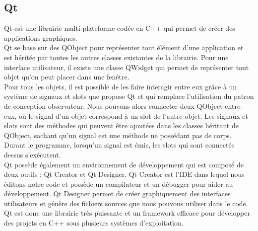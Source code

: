 \subsection{Qt}

Qt est une librairie multi-plateforme codée en C++ qui permet de créer des applications graphiques. \\

Qt se base sur des QObject pour représenter tout élément d'une application et est héritée par toutes les autres classes existantes de la librairie. Pour une interface utilisateur, il existe une classe QWidget qui permet de représenter tout objet qu'on peut placer dans une fenêtre.\\

Pour tous les objets, il est possible de les faire interagir entre eux grâce à un système de signaux et slots que propose Qt et qui remplace l'utilisation du patron de conception observateur. Nous pouvons alors connecter deux QObject entre-eux, où le signal d'un objet correspond à un slot de l'autre objet. Les signaux et slots sont des méthodes qui peuvent être ajoutées dans les classes héritant de QObject, sachant qu'un signal est une méthode ne possédant pas de corps. Durant le programme, lorsqu'un signal est émis, les slots qui sont connectés dessus s'exécutent. \\

Qt possède également un environnement de développement qui est composé de deux outils : Qt Creator et Qt Designer. Qt Creator est l'IDE dans lequel nous éditons notre code et possède un compilateur et un débugger pour aider au développement. Qt Designer permet de créer graphiquement des interfaces utilisateurs et génère des fichiers sources que nous pouvons utiliser dans le code. \\

Qt est donc une librairie très puissante et un framework efficace pour développer des projets en C++ sous plusieurs systèmes d'exploitation.